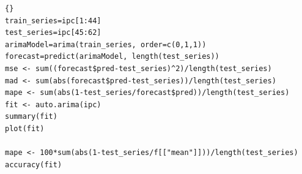 %
%
%
\begin{lstlisting}[title={‘Código R: REVISAR: Diapo 59(125)’},basicstyle=\ttfamily]{}
train_series=ipc[1:44]
test_series=ipc[45:62]
arimaModel=arima(train_series, order=c(0,1,1))
forecast=predict(arimaModel, length(test_series))
mse <- sum((forecast$pred-test_series)^2)/length(test_series)
mad <- sum(abs(forecast$pred-test_series))/length(test_series)
mape <- sum(abs(1-test_series/forecast$pred))/length(test_series)
fit <- auto.arima(ipc)
summary(fit)
plot(fit)

mape <- 100*sum(abs(1-test_series/f[["mean"]]))/length(test_series)
accuracy(fit)
\end{lstlisting}


